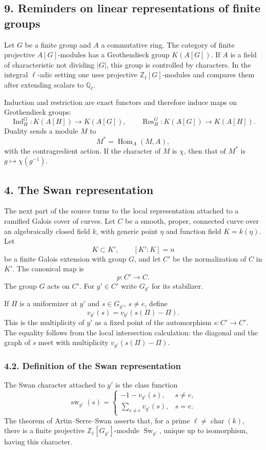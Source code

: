 \documentclass[14pt]{extarticle}
\newcommand{\ZZ}{\mathbb Z}
\newcommand{\QQ}{\mathbb Q}
\newcommand{\Hom}{\operatorname{Hom}}
\newcommand{\Sw}{\operatorname{Sw}}
\begin{document}
\subsection*{9. Reminders on linear representations of finite groups}

Let $G$ be a finite group and $A$ a commutative ring. The category of finite projective $A[G]$-modules has a Grothendieck group $K(A[G])$. If $A$ is a field of characteristic not dividing $|G|$, this group is controlled by characters. In the integral $\ell$-adic setting one uses projective $\ZZ_\ell[G]$-modules and compares them after extending scalars to $\QQ_\ell$.

Induction and restriction are exact functors and therefore induce maps on Grothendieck groups:
\[
   \operatorname{Ind}_H^G:K(A[H])\to K(A[G]),
   \qquad
   \operatorname{Res}_H^G:K(A[G])\to K(A[H]).
\]
Duality sends a module $M$ to
\[
   M^*=\Hom_A(M,A),
\]
with the contragredient action. If the character of $M$ is $\chi$, then that of $M^*$ is $g\mapsto\chi(g^{-1})$.

\subsection*{4. The Swan representation}

The next part of the source turns to the local representation attached to a ramified Galois cover of curves. Let $C$ be a smooth, proper, connected curve over an algebraically closed field $k$, with generic point $\eta$ and function field $K=k(\eta)$. Let
\[
   K\subset K',\qquad [K':K]=n
\]
be a finite Galois extension with group $G$, and let $C'$ be the normalization of $C$ in $K'$. The canonical map is
\[
   p:C'\to C.
\]
The group $G$ acts on $C'$. For $y'\in C'$ write $G_{y'}$ for its stabilizer.

If $\Pi$ is a uniformizer at $y'$ and $s\in G_{y'}$, $s\ne e$, define
\[
   v_{y'}(s)=v_{y'}(s(\Pi)-\Pi).
\]
This is the multiplicity of $y'$ as a fixed point of the automorphism $s:C'\to C'$. The equality follows from the local intersection calculation: the diagonal and the graph of $s$ meet with multiplicity $v_{y'}(s(\Pi)-\Pi)$.

\subsubsection*{4.2. Definition of the Swan representation}

The Swan character attached to $y'$ is the class function
\[
   \operatorname{sw}_{y'}(s)=
   \begin{cases}
      -1-v_{y'}(s), & s\ne e,\\[0.3em]
      \sum_{s\ne e}v_{y'}(s), & s=e.
   \end{cases}
\]
The theorem of Artin--Serre--Swan asserts that, for a prime $\ell\ne\operatorname{char}(k)$, there is a finite projective $\ZZ_\ell[G_{y'}]$-module $\Sw_{y'}$, unique up to isomorphism, having this character.
\end{document}
